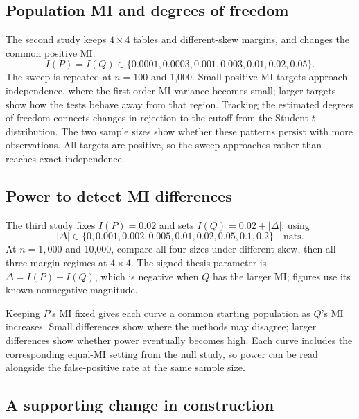 \subsection{Population MI and degrees of freedom}

The second study keeps \(4\times4\) tables and different-skew margins,
and changes the common positive MI:
\begin{equation}
 I(P)=I(Q)\in\{0.0001,0.0003,0.001,0.003,0.01,0.02,0.05\}.
 \label{eq:association-grid}
\end{equation}
The sweep is repeated at \(n=100\) and 1,000. Small positive MI targets
approach independence, where the first-order MI variance becomes small;
larger targets show how the tests behave away from that region. Tracking
the estimated degrees of freedom connects changes in rejection to the
cutoff from the Student \(t\) distribution. The two sample sizes show
whether these patterns persist with more observations. All targets are
positive, so the sweep approaches rather than reaches exact independence.

\subsection{Power to detect MI differences}

The third study fixes \(I(P)=0.02\) and sets \(I(Q)=0.02+|\Delta|\),
using
\begin{equation}
 |\Delta|\in\{0,0.001,0.002,0.005,0.01,0.02,0.05,0.1,0.2\}
 \quad\text{nats}.
 \label{eq:detection-grid}
\end{equation}
At \(n=1{,}000\) and 10,000, compare all four sizes under different skew,
then all three margin regimes at \(4\times4\).
The signed thesis parameter is \(\Delta=I(P)-I(Q)\), which is negative
when \(Q\) has the larger MI; figures use its known nonnegative magnitude.

Keeping \(P\)'s MI fixed gives each curve a common starting population
as \(Q\)'s MI increases. Small differences show where the methods may
disagree; larger differences show whether power eventually becomes high.
Each curve includes the corresponding equal-MI setting from the null
study, so power can be read alongside the false-positive rate at the
same sample size.

\subsection{A supporting change in construction}

